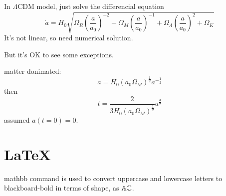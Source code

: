 \documentclass[10pt, a4paper, lualatex]{article}
\begin{document}


In $\Lambda$CDM model, 
just solve the differencial equation
\begin{equation}
    \dot{a} = H_0 \sqrt{\Omega_R \left(\frac{a}{a_0}\right)^{-2} + \Omega_M \left(\frac{a}{a_0}\right)^{-1} + \Omega_\Lambda\left(\frac{a}{a_0}\right)^{2} + \Omega_K}
\end{equation}
It's not linear, so need numerical solution. 

But it's OK to see some  exceptions.
\begin{Pro}
    matter donimated:
    \begin{equation}
        \dot{a} = H_0 (a_0 \Omega_M)^{\frac{1}{2}}  a^{-\frac{1}{2}} 
    \end{equation}
    then 
    \begin{equation}
        t = \frac{2}{3 H_0 (a_0 \Omega_M)^{\frac{1}{2}} } a^{\frac{3}{2}} 
    \end{equation}
    assumed $a(t=0)=0$.
\end{Pro}

\section*{\LaTeX}

mathbb command is used to convert uppercase and lowercase letters to blackboard-bold in terms of shape, as $\mathbb{A} \mathbb{C}$.
\end{document}
